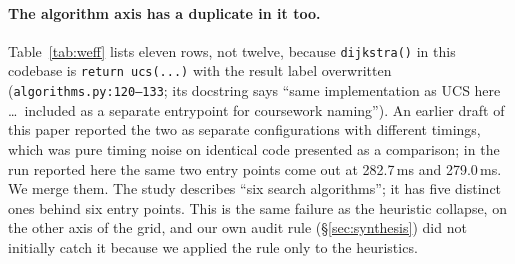 \documentclass[11pt]{article}
\begin{document}
\paragraph{The algorithm axis has a duplicate in it too.} Table~\ref{tab:weff} lists eleven rows,
not twelve, because \texttt{dijkstra()} in this codebase is \texttt{return ucs(...)} with the result
label overwritten (\texttt{algorithms.py:120--133}; its docstring says ``same implementation as UCS
here \dots\ included as a separate entrypoint for coursework naming''). An earlier draft of this
paper reported the two as separate configurations with different timings, which was pure timing
noise on identical code presented as a comparison; in the run reported here the same two entry
points come out at 282.7\,ms and 279.0\,ms. We merge them. The study describes ``six search
algorithms''; it has five distinct ones behind six entry points. This is the same failure as the
heuristic collapse, on the other axis of the grid, and our own audit rule (\S\ref{sec:synthesis})
did not initially catch it because we applied the rule only to the heuristics.
\end{document}
